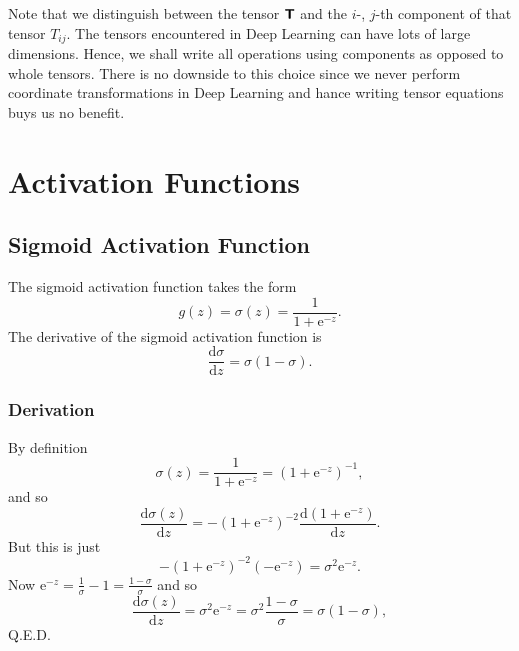 \documentclass[modern]{aastex61}
\newcommand{\ue}{\mathrm{e}}
\newcommand{\uderivative}{\mathrm{d}}
\begin{document}
Note that we distinguish between the tensor $\textbf{\textsf{T}}$ and the $i$-, $j$-th component of that tensor $T_{ij}$. The tensors encountered in Deep Learning can have lots of large dimensions. Hence, we shall write all operations using components as opposed to whole tensors. There is no downside to this choice since we never perform coordinate transformations in Deep Learning and hance writing tensor equations buys us no benefit.

\section{Activation Functions} \label{sec:act}

\subsection{Sigmoid Activation Function} \label{sec:sigmoid}

The sigmoid activation function takes the form
\begin{equation} \label{eq:sigmoid}
  g(z) = \sigma(z) = \frac{1}{1 + \ue^{-z}}.
\end{equation}
The derivative of the sigmoid activation function is
\begin{equation} \label{eq:sigmoidderivative}
  \frac{\uderivative \sigma}{\uderivative z} = \sigma(1 - \sigma).
\end{equation}

\subsubsection{Derivation}

By definition
\begin{equation*}
  \sigma(z) = \frac{1}{1 + \ue^{-z}} = (1 + \ue^{-z})^{-1},
\end{equation*}
and so
\begin{equation*}
  \frac{\uderivative \sigma(z)}{\uderivative z} = -(1 + \ue^{-z})^{-2} \frac{\uderivative (1 + \ue^{-z}) }{\uderivative z}.
\end{equation*}
But this is just
\begin{equation*}
  -(1 + \ue^{-z})^{-2} (-\ue^{-z}) = \sigma^{2} \ue^{-z}.
\end{equation*}
Now $\ue^{-z} = \frac{1}{\sigma} - 1 = \frac{1 - \sigma}{\sigma}$ and so
\begin{equation*}
  \frac{\uderivative \sigma(z)}{\uderivative z} = \sigma^{2} \ue^{-z} = \sigma^{2} \frac{1 - \sigma}{\sigma} = \sigma (1 - \sigma),
\end{equation*}
Q.E.D.
\end{document}
